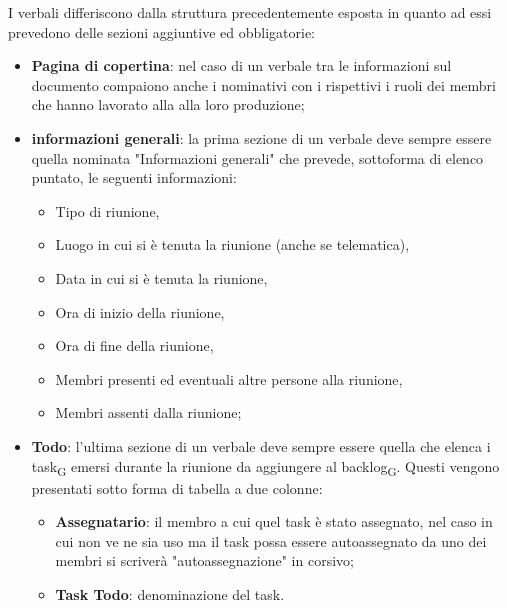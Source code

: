 \label{sec: struttura verbali}
I verbali differiscono dalla struttura precedentemente esposta in quanto ad essi prevedono delle sezioni aggiuntive ed obbligatorie:
\begin{itemize}
    \item \textbf{Pagina di copertina}: nel caso di un verbale tra le informazioni sul documento compaiono anche i nominativi con i rispettivi i ruoli dei membri che hanno lavorato alla alla loro produzione;
    \item \textbf{informazioni generali}: la prima sezione di un verbale deve sempre essere quella nominata "Informazioni generali" che prevede, sottoforma di elenco puntato, le seguenti informazioni:
        \begin{itemize}
            \item Tipo di riunione,
            \item Luogo in cui si è tenuta la riunione (anche se telematica),
            \item Data in cui si è tenuta la riunione,
            \item Ora di inizio della riunione,
            \item Ora di fine della riunione,
            \item Membri presenti ed eventuali altre persone alla riunione,
            \item Membri assenti dalla riunione;
        \end{itemize}
     \item \textbf{Todo}: l'ultima sezione di un verbale deve sempre essere quella che elenca i task\textsubscript{G} emersi durante la riunione da aggiungere al backlog\textsubscript{G}. Questi vengono presentati sotto forma di tabella a due colonne:
     \begin{itemize}
         \item \textbf{Assegnatario}: il membro a cui quel task è stato assegnato, nel caso in cui non ve ne sia uso ma il task possa essere autoassegnato da uno dei membri si scriverà "autoassegnazione" in corsivo;
         \item \textbf{Task Todo}: denominazione del task.
     \end{itemize}
     
\end{itemize}

